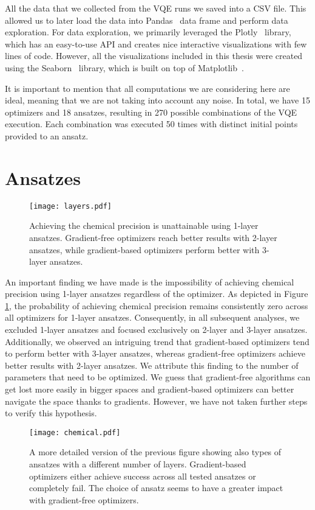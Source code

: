 All the data that we collected from the VQE runs we saved into a CSV file. This allowed us to later load the data into Pandas~\cite{pandas} data frame and perform data exploration. For data exploration, we primarily leveraged the Plotly~\cite{plotly} library, which has an easy-to-use API and creates nice interactive visualizations with few lines of code. However, all the visualizations included in this thesis were created using the Seaborn~\cite{seaborn} library, which is built on top of Matplotlib~\cite{seaborn}.

It is important to mention that all computations we are considering here are ideal, meaning that we are not taking into account any noise. In total, we have 15 optimizers and 18 ansatzes, resulting in 270 possible combinations of the VQE execution. Each combination was executed 50 times with distinct initial points provided to an ansatz.

\section{Ansatzes}
\begin{figure}[H]
    \centering
    \texttt{[image: layers.pdf]}
    \caption{Achieving the chemical precision is unattainable using 1-layer ansatzes. Gradient-free optimizers reach better results with 2-layer ansatzes, while gradient-based optimizers perform better with 3-layer ansatzes.}
    \label{fig:ansatz-layers}
\end{figure}
An important finding we have made is the impossibility of achieving chemical precision using 1-layer ansatzes regardless of the optimizer. As depicted in Figure \ref{fig:ansatz-layers}, the probability of achieving chemical precision remains consistently zero across all optimizers for 1-layer ansatzes. Consequently, in all subsequent analyses, we excluded 1-layer ansatzes and focused exclusively on 2-layer and 3-layer ansatzes. Additionally, we observed an intriguing trend that gradient-based optimizers tend to perform better with 3-layer ansatzes, whereas gradient-free optimizers achieve better results with 2-layer ansatzes. We attribute this finding to the number of parameters that need to be optimized. We guess that gradient-free algorithms can get lost more easily in bigger spaces and gradient-based optimizers can better navigate the space thanks to gradients. However, we have not taken further steps to verify this hypothesis. 

\begin{figure}[H]
    \centering
    \texttt{[image: chemical.pdf]}
    \caption{A more detailed version of the previous figure showing also types of ansatzes with a different number of layers. Gradient-based optimizers either achieve success across all tested ansatzes or completely fail. The choice of ansatz seems to have a greater impact with gradient-free optimizers.}
    \label{fig:chemical}
\end{figure}

